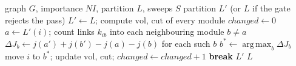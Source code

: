 \documentclass[conference]{IEEEtran}
\DeclareMathOperator*{\argmax}{arg\,max}
\begin{document}
\begin{algorithm}[!t]
\footnotesize
\caption{\textsc{SynwalkMoves}$(G,NI,L,S)$: Synwalk boundary moves}\label{alg:moves}
\begin{algorithmic}[1]
\Require graph $G$, importance $NI$, partition $L$, sweeps $S$
\Ensure partition $L'$ (or $L$ if the gate rejects the pass)
\State $L'\gets L$; compute $\mathrm{vol}$, $\mathrm{cut}$ of every module
  \State $changed\gets0$
    \State $a\gets L'(i)$; count links $k_{ib}$ into each neighbouring module $b\ne a$
    \State $\Delta J_b\gets j(a')+j(b')-j(a)-j(b)$ for each such $b$ 
    \State $b^{*}\gets\argmax_b\Delta J_b$
      \State move $i$ to $b^{*}$; update $\mathrm{vol}$, $\mathrm{cut}$; $changed\gets changed+1$
    \EndIf
  \EndFor
   \textbf{break} \EndIf
\EndFor
{}
  \State \Return $L'$
\Else
  \State \Return $L$ 
\EndIf
\end{algorithmic}
\end{algorithm}
\end{document}
